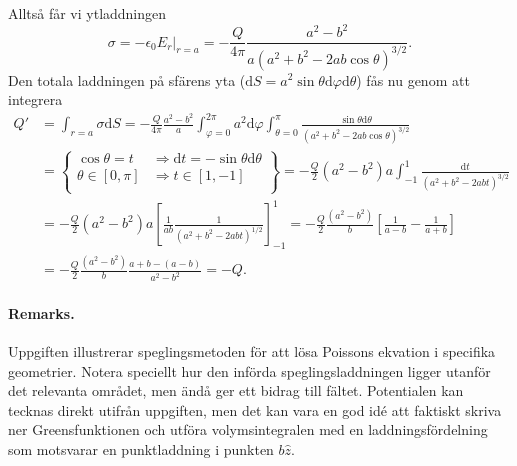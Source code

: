 \documentclass[%
oneside,                 %
final,                   %
10pt]{article}
\newenvironment{doconceexercise}{}{}
\begin{document}
\begin{doconceexercise}
Alltså får vi ytladdningen
$$
\sigma = -\epsilon_0 \left. E_r \right|_{r=a} = -\frac{Q}{4 \pi} \frac{a^2 - b^2}{a \left( a^2 + b^2 - 2 a b \cos\theta \right)^{3/2}}.
$$
Den totala laddningen på sfärens yta ($\mbox{d}S = a^2 \sin\theta \mbox{d}\varphi \mbox{d}\theta$) fås nu genom att integrera
\begin{align}
Q' &= \int_{r=a} \sigma \mbox{d}S = -\frac{Q}{4\pi} \frac{a^2-b^2}{a} \int_{\varphi=0}^{2\pi} a^2 \mbox{d}\varphi \int_{\theta=0}^\pi \frac{\sin\theta \mbox{d}\theta}{\left( a^2 + b^2 - 2 a b \cos\theta \right)^{3/2}} \nonumber \\
&= \left\{ \begin{array}{ll}
\cos\theta = t & \Rightarrow \mbox{d}t = -\sin\theta \mbox{d}\theta \\
\theta \in [0,\pi] & \Rightarrow t \in [1,-1] \\
\end{array} \right\} = - \frac{Q}{2} (a^2 - b^2) a \int_{-1}^1 \frac{\mbox{d}t} {\left( a^2 + b^2 - 2 a b t \right)^{3/2}} \nonumber \\
& = - \frac{Q}{2} (a^2 - b^2) a \left[ \frac{1}{ab} \frac{1}{\left( a^2 + b^2 - 2 a b t \right)^{1/2}} \right]_{-1}^1 = - \frac{Q}{2} \frac{(a^2 - b^2)}{b} \left[ \frac{1}{a-b} - \frac{1}{a+b} \right] \nonumber \\
& = - \frac{Q}{2} \frac{(a^2 - b^2)}{b} \frac{a + b - (a - b)}{a^2 - b^2} = -Q.
\end{align}



\paragraph{Remarks.}
Uppgiften illustrerar speglingsmetoden för att lösa Poissons ekvation i specifika geometrier. Notera speciellt hur den införda speglingsladdningen ligger utanför det relevanta området, men ändå ger ett bidrag till fältet. Potentialen kan tecknas direkt utifrån uppgiften, men det kan vara en god idé att faktiskt skriva ner Greensfunktionen och utföra volymsintegralen med en laddningsfördelning som motsvarar en punktladdning i punkten $b \hat{z}$.


\end{doconceexercise}



\end{document}
